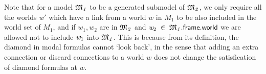 \documentclass[letterpaper]{article}
\renewcommand{\HOLinline}[1]{\ensuremath{#1}}
\begin{document}
Note that for a model \HOLinline{\HOLFreeVar{\ensuremath{\mathfrak{M}\sb{1}}}} to be a generated submodel of \HOLinline{\HOLFreeVar{\ensuremath{\mathfrak{M}\sb{2}}}}, we only require all the worlds $w'$ which have a link from a world $w$ in $M_1$ to be also included in the world set of $M_1$, and if $w_1,w_2$ are in \HOLinline{\HOLFreeVar{\ensuremath{\mathfrak{M}\sb{2}}}} and \HOLinline{\HOLFreeVar{w\sb{\mathrm{2}}}\;\HOLSymConst{\HOLTokenIn{}}\;\HOLFreeVar{\ensuremath{\mathfrak{M}\sb{1}}}.\HOLFieldName{frame}.\HOLFieldName{world}} we are allowed not to include \HOLinline{\HOLFreeVar{w\sb{\mathrm{1}}}} into \HOLinline{\HOLFreeVar{\ensuremath{\mathfrak{M}\sb{1}}}}. This is because from its definition, the diamond in modal formulas cannot `look back', in the sense that adding an extra connection or discard connections to a world $w$ does not change the satisfication of diamond formulas at $w$. 
\end{document}
